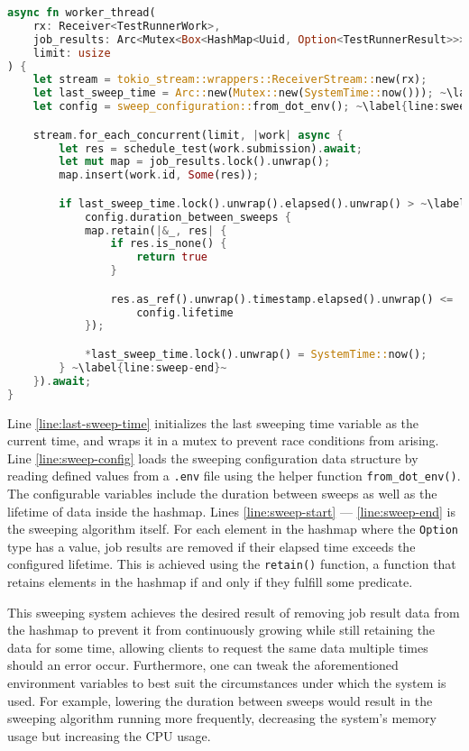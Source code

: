\begin{lstlisting}[language=rust, escapechar=~, caption={Temp}, label={lst:sweeping}]
async fn worker_thread(
    rx: Receiver<TestRunnerWork>,
    job_results: Arc<Mutex<Box<HashMap<Uuid, Option<TestRunnerResult>>>>>,
    limit: usize
) {
    let stream = tokio_stream::wrappers::ReceiverStream::new(rx);
    let last_sweep_time = Arc::new(Mutex::new(SystemTime::now())); ~\label{line:last-sweep-time}~
    let config = sweep_configuration::from_dot_env(); ~\label{line:sweep-config}~

    stream.for_each_concurrent(limit, |work| async {
        let res = schedule_test(work.submission).await;
        let mut map = job_results.lock().unwrap();
        map.insert(work.id, Some(res));

        if last_sweep_time.lock().unwrap().elapsed().unwrap() > ~\label{line:sweep-start}~
            config.duration_between_sweeps {
            map.retain(|&_, res| {
                if res.is_none() {
                    return true
                }

                res.as_ref().unwrap().timestamp.elapsed().unwrap() <=
                    config.lifetime
            });

            *last_sweep_time.lock().unwrap() = SystemTime::now();
        } ~\label{line:sweep-end}~
    }).await;
}
\end{lstlisting}

Line \ref{line:last-sweep-time} initializes the last sweeping time variable as the current time, and wraps it in a mutex to prevent race conditions from arising.
Line \ref{line:sweep-config} loads the sweeping configuration data structure by reading defined values from a \texttt{.env} file using the helper function \texttt{from\_dot\_env()}.
The configurable variables include the duration between sweeps as well as the lifetime of data inside the hashmap.
Lines \ref{line:sweep-start} --- \ref{line:sweep-end} is the sweeping algorithm itself.
For each element in the hashmap where the \texttt{Option} type has a value, job results are removed if their elapsed time exceeds the configured lifetime.
This is achieved using the \texttt{retain()} function, a function that retains elements in the hashmap if and only if they fulfill some predicate.

This sweeping system achieves the desired result of removing job result data from the hashmap to prevent it from continuously growing while still retaining the data for some time, allowing clients to request the same data multiple times should an error occur.
Furthermore, one can tweak the aforementioned environment variables to best suit the circumstances under which the system is used.
For example, lowering the duration between sweeps would result in the sweeping algorithm running more frequently, decreasing the system's memory usage but increasing the CPU usage.